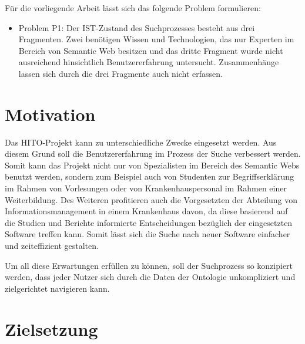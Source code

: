 
Für die vorliegende Arbeit lässt sich das folgende Problem formulieren:

\begin{itemize}
\item Problem P1: Der IST-Zustand des Suchprozesses besteht aus drei Fragmenten. 
Zwei benötigen Wissen und Technologien, das nur Experten im Bereich von Semantic Web besitzen und das dritte Fragment wurde nicht ausreichend hinsichtlich Benutzererfahrung untersucht.
Zusammenhänge lassen sich durch die drei Fragmente auch nicht erfassen.
\end{itemize}

\section{Motivation}\label{sec:motivation}

Das HITO-Projekt kann zu unterschiedliche Zwecke eingesetzt werden. Aus diesem Grund soll die Benutzererfahrung im Prozess der Suche verbessert werden. Somit kann das Projekt nicht nur von Spezialisten im Bereich des Semantic Webs benutzt werden, sondern zum Beispiel auch von Studenten zur Begriffserklärung im Rahmen von Vorlesungen oder von Krankenhauspersonal im Rahmen einer Weiterbildung. Des Weiteren profitieren auch die Vorgesetzten der Abteilung von Informationsmanagement in einem Krankenhaus davon, da diese basierend auf die Studien und Berichte informierte Entscheidungen bezüglich der eingesetzten Software treffen kann. Somit lässt sich die Suche nach neuer Software einfacher und zeiteffizient gestalten.

Um all diese Erwartungen erfüllen zu können, soll der Suchprozess so konzipiert werden, dass jeder Nutzer sich durch die Daten der Ontologie unkompliziert und zielgerichtet navigieren kann.

\section{Zielsetzung}\label{sec:zielsetzung}

